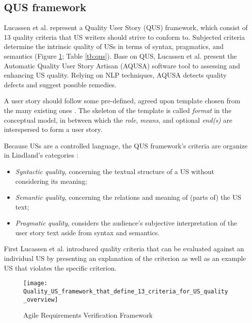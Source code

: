 \subsection{QUS framework} \label{usq_3}
Lucassen et al. \cite{lucassen2016improving} represent a Quality User Story (QUS) framework, which consist of 13 quality criteria that US writers should strive to conform to. Subjected criteria determine the intrinsic quality of USs in terms of syntax, pragmatics, and semantics (Figure \ref{fig:qus_framework}; Table \ref{tb:qus}). Base on QUS, Lucassen et al. present the Automatic Quality User Story Artisan (AQUSA) software tool to assessing and enhancing US quality. Relying on NLP techniques, AQUSA detects quality defects and suggest possible remedies.

A user story should follow some pre-deﬁned, agreed upon template chosen from the many existing ones \cite{wautelet2014unifying}. The skeleton of the template is called \emph{format} in the conceptual model, in between which the \emph{role}, \emph{means}, and optional \emph{end(s)} are interspersed to form a user story. 

Because USs are a controlled language, the QUS framework’s criteria are organize in Lindland’s categories \cite{lindland1994understanding}:

\begin{itemize}
\item\emph{ Syntactic quality}, concerning the textual structure of a US without considering its meaning;
\item \emph{Semantic quality}, concerning the relations and meaning of (parts of) the US text;
\item \emph{Pragmatic quality}, considers the audience’s subjective interpretation of the user story text aside from syntax and semantics.
\end{itemize}

First Lucassen et al. introduced quality criteria that can be evaluated against an individual US by presenting an explanation of the criterion as well as an example US that violates the speciﬁc criterion.


\begin{figure}
\center
\texttt{[image: Quality\_US\_framework\_that\_define\_13\_criteria\_for\_US\_quality\_overview]}
\caption{Agile Requirements Verification Framework \cite{lucassen2016improving}}\label{fig:qus_framework}
\end{figure}

